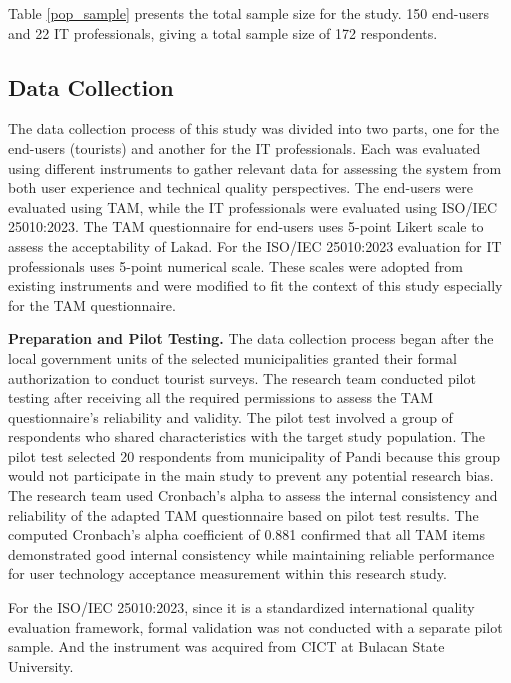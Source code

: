 Table \ref{pop_sample} presents the total sample size for the study. 150 end-users and 22 IT professionals, giving a total sample size of 172 respondents.

\subsection{Data Collection}

The data collection process of this study was divided into two parts, one for the end-users (tourists) and another for the IT professionals. Each was evaluated using different instruments to gather relevant data for assessing the system from both user experience and technical quality perspectives. The end-users were evaluated using TAM, while the IT professionals were evaluated using ISO/IEC 25010:2023. The TAM questionnaire for end-users uses 5-point Likert scale to assess the acceptability of Lakad. For the ISO/IEC 25010:2023 evaluation for IT professionals uses 5-point numerical scale. These scales were adopted from existing instruments and were modified to fit the context of this study especially for the TAM questionnaire. 

\textbf{Preparation and Pilot Testing.} The data collection process began after the local government units of the selected municipalities granted their formal authorization to conduct tourist surveys. The research team conducted pilot testing after receiving all the required permissions to assess the TAM questionnaire’s reliability and validity. The pilot test involved a group of respondents who shared characteristics with the target study population. The pilot test selected 20 respondents from municipality of Pandi because this group would not participate in the main study to prevent any potential research bias. The research team used Cronbach’s alpha to assess the internal consistency and reliability of the adapted TAM questionnaire based on pilot test results. The computed Cronbach’s alpha coefficient of 0.881 confirmed that all TAM items demonstrated good internal consistency while maintaining reliable performance for user technology acceptance measurement within this research study.

For the ISO/IEC 25010:2023, since it is a standardized international quality evaluation framework, formal validation was not conducted with a separate pilot sample. And the instrument was acquired from CICT at Bulacan State University.

